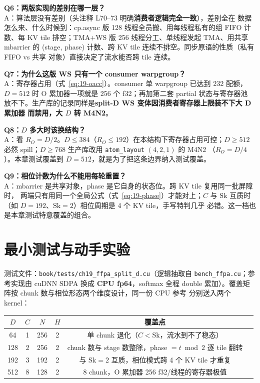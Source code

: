\textbf{Q6：两版实现的差别在哪一层？}\\
A：算法层没有差别（头注释 L70--73 明确\textbf{消费者逻辑完全一致}），差别全在
数据怎么来、什么时候到：cp.async 版 128 线程全员搬、用每线程私有的组 FIFO
计数、每 KV tile 排空；TMA+WS 版 256 线程分工、单线程发起 TMA、用共享 mbarrier 的
(stage, phase) 计数、跨 KV tile 连续不排空。同步原语的性质（私有 FIFO vs 共享
对象）直接决定了流水能否跨 tile 连续。

\textbf{Q7：为什么这版 WS 只有一个 consumer warpgroup？}\\
A：寄存器占用（式~\ref{eq:19-oacc}）。consumer 单 warpgroup 已达到 232 配额，
$D{=}512$ 时 O 累加器一项就是 256 个 f32；再加第二套 partial 状态与寄存器池
放不下。生产库的记录同样是\textbf{split-D WS 变体因消费者寄存器上限装不下大 D 累加器
而禁用，大 $D$ 转 M4N2}。

\textbf{Q8：$D$ 多大时该换结构？}\\
A：看 $R_O = D/2$。$D \le 384$（$R_O \le 192$）在本结构下寄存器占用可控；$D \ge 512$
必然 spill；$D \ge 768$ 生产库改用 \texttt{atom\_layout} $(4,2,1)$ 的 M4N2
（$R_O = D/4$）。本章测试覆盖到 $D{=}512$，就是为了把这条边界纳入测试覆盖。

\textbf{Q9：相位计数为什么不能用每轮重置？}\\
A：mbarrier 是共享对象，phase 是它自身的状态位。跨 KV tile 复用同一批屏障时，
两端只有用同一个全局公式（式~\ref{eq:19-phase}）才能对上；$C$ 与 $\mathrm{Sk}$
互质时（如 $D{=}192$、$\mathrm{Sk}{=}2$）相位周期是 4 个 KV tile，手写特判几乎
必错。这一档也是本章测试特意覆盖的组合。

\section{最小测试与动手实验}

测试文件：\texttt{book/\allowbreak{}tests/\allowbreak{}ch19\_\allowbreak{}ffpa\_\allowbreak{}split\_\allowbreak{}d.cu}（逻辑抽取自
\texttt{bench\_\allowbreak{}ffpa.\allowbreak{}cu}；参考实现由 cuDNN SDPA 换成 \textbf{CPU fp64}，softmax
全程 double 累加）。覆盖矩阵按 chunk 数与相位形态两个维度设计，同一份 CPU 参考
分别送入两个 kernel：

\begin{center}
\begin{tabular}{cccccl}
\toprule
$D$ & $C$ & $N$ & $H$ & 覆盖点 & \\
\midrule
64 & 1 & 256 & 2 & 单 chunk 退化（$C < \mathrm{Sk}$，流水到不了稳态） & \\
128 & 2 & 256 & 2 & chunk 数与 stage 数整除，phase $= t \bmod 2$ 逐 tile 翻转 & \\
192 & 3 & 192 & 2 & 与 $\mathrm{Sk}{=}2$ 互质，相位模式跨 4 个 KV tile 才重复 & \\
512 & 8 & 128 & 2 & 8 chunk，O 累加器 256 f32/线程的寄存器极值 & \\
\bottomrule
\end{tabular}
\end{center}

